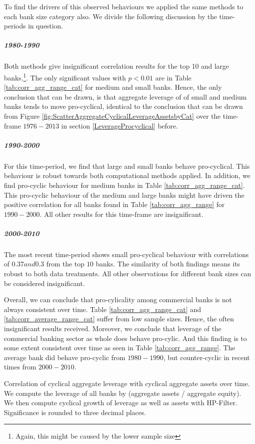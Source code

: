 \documentclass[12pt, a4paper]{article} %
\begin{document}
To find the drivers of this observed behaviours we applied the same methods to each bank size category also.
We divide the following discussion by the time-periods in question.

\subparagraph{1980-1990}
Both methods give insignificant correlation results for the top 10 and large banks.\footnote{Again, this might be caused by the lower sample size}. The only significant values with $p<0.01$ are in Table \ref{tab:corr_agg_range_cat} for medium and small banks. Hence, the only conclusion that can be drawn, is that aggregate leverage of of small and medium banks tends to move pro-cyclical, identical to the conclusion that can be drawn from Figure \ref{fig:ScatterAggregateCyclicalLeverageAssetsbyCat} over the time-frame $1976-2013$ in section \ref{LeverageProcyclical} before. 

\subparagraph{1990-2000}
For this time-period, we find that large and small banks behave pro-cyclical. This behaviour is robust towards both computational methods applied. In addition, we find pro-cyclic behaviour for medium banks in Table \ref{tab:corr_agg_range_cat}. This pro-cyclic behaviour of the medium and large banks might have driven the positive correlation for all banks found in Table \ref{tab:corr_agg_range} for $1990-2000$. All other results for this time-frame are insignificant.

\subparagraph{2000-2010}
The most recent time-period shows small pro-cyclical behaviour with correlations of $0.37 and 0.3$ from the top $10$ banks. The similarity of both findings means its robust to both data treatments. All other observations for different bank sizes can be considered insignificant.

Overall, we can conclude that pro-cylicality among commercial banks is not always consistent over time. Table \ref{tab:corr_agg_range_cat} and \ref{tab:corr_average_range_cat} suffer from low sample sizes. Hence, the often insignificant results received. Moreover, we conclude that leverage of the commercial banking sector as whole does behave pro-cylic. And this finding is to some extent consistent over time as seen in Table \ref{tab:corr_agg_range}. The average bank did behave pro-cyclic from $1980-1990$, but counter-cyclic in recent times from $2000-2010$. 



\begin{table}[H]
\begin{minipage}{\textwidth}

\caption[1]{Correlation of cyclical aggregate leverage with cyclical aggregate assets over time. We compute the leverage of all banks by (aggregate assets / aggregate equity). We then compute cyclical growth of leverage as well as assets with HP-Filter. Significance is rounded to three decimal places.}
\label{tab:corr_agg_range_cat}
\end{minipage}
\end{table}
\end{document}
